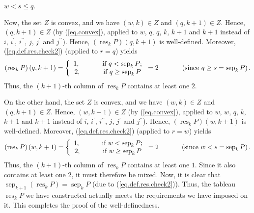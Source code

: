 \documentclass[numbers=enddot,12pt,final,onecolumn,notitlepage]{scrartcl}%
\theoremstyle{definition}
\begin{document}
\begin{itemize}
{$w<s\leq q$.
\par
Now, the set $Z$ is convex, and we have $\left(  w,k\right)  \in Z$ and
$\left(  q,k+1\right)  \in Z$. Hence, $\left(  q,k+1\right)  \in Z$ (by
(\ref{eq.convex}), applied to $w$, $q$, $q$, $k$, $k+1$ and $k+1$ instead of
$i$, $i^{\prime}$, $i^{\prime\prime}$, $j$, $j^{\prime}$ and $j^{\prime\prime
}$). Hence, $\left(  \operatorname*{res}\nolimits_{k}P\right)  \left(
q,k+1\right)  $ is well-defined. Moreover, (\ref{eq.def.res.check2}) (applied
to $r=q$) yields
\[
\left(  \operatorname*{res}\nolimits_{k}P\right)  \left(  q,k+1\right)
=\left\{
\begin{array}
[c]{c}%
1,\ \ \ \ \ \ \ \ \ \ \text{if }q<\operatorname*{sep}\nolimits_{k}P;\\
2,\ \ \ \ \ \ \ \ \ \ \text{if }q\geq\operatorname*{sep}\nolimits_{k}P
\end{array}
\right.  =2\ \ \ \ \ \ \ \ \ \ \left(  \text{since }q\geq
s=\operatorname*{sep}\nolimits_{k}P\right)  .
\]
Thus, the $\left(  k+1\right)  $-th column of $\operatorname*{res}%
\nolimits_{k}P$ contains at least one $2$.
\par
On the other hand, the set $Z$ is convex, and we have $\left(  w,k\right)  \in
Z$ and $\left(  q,k+1\right)  \in Z$. Hence, $\left(  w,k+1\right)  \in Z$ (by
(\ref{eq.convex}), applied to $w$, $w$, $q$, $k$, $k+1$ and $k+1$ instead of
$i$, $i^{\prime}$, $i^{\prime\prime}$, $j$, $j^{\prime}$ and $j^{\prime\prime
}$). Hence, $\left(  \operatorname*{res}\nolimits_{k}P\right)  \left(
w,k+1\right)  $ is well-defined. Moreover, (\ref{eq.def.res.check2}) (applied
to $r=w$) yields
\[
\left(  \operatorname*{res}\nolimits_{k}P\right)  \left(  w,k+1\right)
=\left\{
\begin{array}
[c]{c}%
1,\ \ \ \ \ \ \ \ \ \ \text{if }w<\operatorname*{sep}\nolimits_{k}P;\\
2,\ \ \ \ \ \ \ \ \ \ \text{if }w\geq\operatorname*{sep}\nolimits_{k}P
\end{array}
\right.  =2\ \ \ \ \ \ \ \ \ \ \left(  \text{since }w<s=\operatorname*{sep}%
\nolimits_{k}P\right)  .
\]
Thus, the $\left(  k+1\right)  $-th column of $\operatorname*{res}%
\nolimits_{k}P$ contains at least one $1$. Since it also contains at least one
$2$, it must therefore be mixed. Now, it is clear that $\operatorname*{sep}%
\nolimits_{k+1}\left(  \operatorname*{res}\nolimits_{k}P\right)
=\operatorname*{sep}\nolimits_{k}P$ (due to (\ref{eq.def.res.check2})). Thus,
the tableau $\operatorname*{res}\nolimits_{k}P$ we have constructed actually
meets the requirements we have imposed on it. This completes the proof of the
well-definedness.}


\end{itemize}
\end{document}
